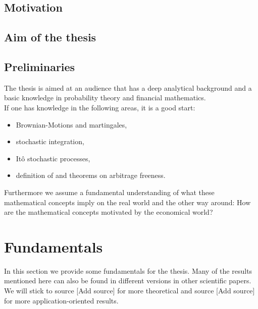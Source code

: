 \documentclass[12pt]{article}
\begin{document}
	\subsection{Motivation}
	\subsection{Aim of the thesis}
	\subsection{Preliminaries}
	The thesis is aimed at an audience that has a deep analytical background and a basic knowledge in probability theory and financial mathematics.\\
	\color{red}If one has knowledge in the following areas, it is a good start:\color{black}
	\begin{itemize}
		\item Brownian-Motions and martingales,
		\item stochastic integration,
		\item Itô stochastic processes,
		\item definition of and theorems on arbitrage freeness.
	\end{itemize}
	Furthermore we assume a fundamental understanding of what these mathematical concepts imply on the real world and the other way around: How are the mathematical concepts motivated by the economical world?
	
	
	
	
	
	
	
	\pagebreak
	\section{Fundamentals}
	In this section we provide some fundamentals for the thesis. Many of the results mentioned here can also be found in different versions in other scientific papers. We will stick to source 
	\color{red}[Add source] \color{black} %
	for more theoretical and source 
	\color{red}[Add source] \color{black} %
	for more application-oriented results.
	
\end{document}
